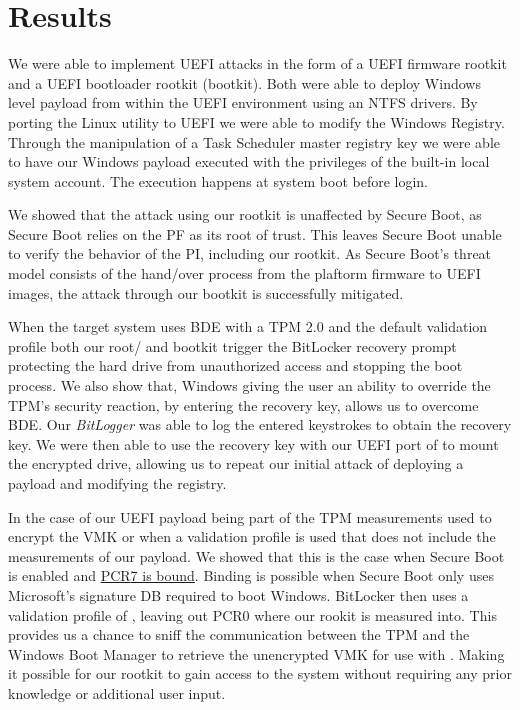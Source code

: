 
\chapter{Results}
\label{sec:results}

We were able to implement \ac{UEFI} attacks in the form of a \ac{UEFI} firmware rootkit and a \ac{UEFI} bootloader rootkit (bootkit).
Both were able to deploy Windows level payload from within the \ac{UEFI} environment using an \ac{NTFS} drivers.
By porting the Linux utility  to \ac{UEFI} we were able to modify the Windows Registry.
Through the manipulation of a Task Scheduler master registry key we were able to have our Windows payload executed with the privileges of the built-in local system account.
The execution happens at system boot before login.

We showed that the attack using our rootkit is unaffected by Secure Boot, as Secure Boot relies on the \ac{PF} as its root of trust.
This leaves Secure Boot unable to verify the behavior of the \ac{PI}, including our rootkit.
As Secure Boot's threat model consists of the hand\-/over process from the plaftorm firmware to \ac{UEFI} images, the attack through our bootkit is successfully mitigated.

When the target system uses \ac{BDE} with a \ac{TPM} 2.0 and the default validation profile \hyperref[tab:pcr-usage]{} both our root\-/ and bootkit trigger the BitLocker recovery prompt protecting the hard drive from unauthorized access and stopping the boot process.
We also show that, Windows giving the user an ability to override the \ac{TPM}'s security reaction, by entering the recovery key, allows us to overcome \ac{BDE}.
Our \emph{BitLogger} was able to log the entered keystrokes to obtain the recovery key.
We were then able to use the recovery key with our \ac{UEFI} port of  to mount the encrypted drive, allowing us to repeat our initial attack of deploying a payload and modifying the registry.

In the case of our \ac{UEFI} payload being part of the \ac{TPM} measurements used to encrypt the \ac{VMK} or when a validation profile is used that does not include the measurements of our payload.
We showed that this is the case when Secure Boot is enabled and \hyperlink{pcr7-binding}{\ac{PCR}7 is bound}.
Binding is possible when Secure Boot only uses Microsoft's signature \ac{DB} required to boot Windows.
BitLocker then uses a validation profile of \hyperref[tab:pcr-usage]{}, leaving out \ac{PCR}0 where our rookit is measured into.
This provides us a chance to sniff the communication between the \ac{TPM} and the Windows Boot Manager to retrieve the unencrypted \ac{VMK} for use with .
Making it possible for our rootkit to gain access to the system without requiring any prior knowledge or additional user input.
